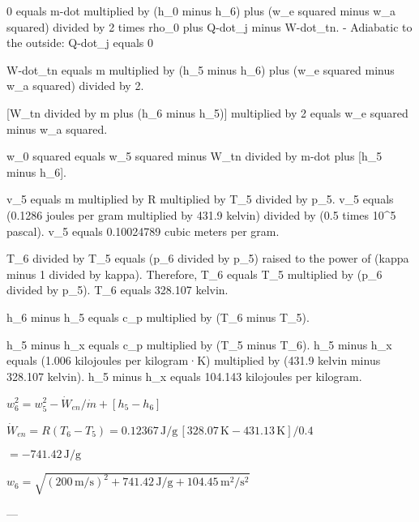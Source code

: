 0 equals m-dot multiplied by (h_0 minus h_6) plus (w_e squared minus w_a squared) divided by 2 times rho_0 plus Q-dot_j minus W-dot_tn.  
- Adiabatic to the outside: Q-dot_j equals 0  

W-dot_tn equals m multiplied by (h_5 minus h_6) plus (w_e squared minus w_a squared) divided by 2.  

[W_tn divided by m plus (h_6 minus h_5)] multiplied by 2 equals w_e squared minus w_a squared.  

w_0 squared equals w_5 squared minus W_tn divided by m-dot plus [h_5 minus h_6].  

v_5 equals m multiplied by R multiplied by T_5 divided by p_5.  
v_5 equals (0.1286 joules per gram multiplied by 431.9 kelvin) divided by (0.5 times 10^5 pascal).  
v_5 equals 0.10024789 cubic meters per gram.  

T_6 divided by T_5 equals (p_6 divided by p_5) raised to the power of (kappa minus 1 divided by kappa).  
Therefore, T_6 equals T_5 multiplied by (p_6 divided by p_5).  
T_6 equals 328.107 kelvin.  

h_6 minus h_5 equals c_p multiplied by (T_6 minus T_5).  

h_5 minus h_x equals c_p multiplied by (T_5 minus T_6).  
h_5 minus h_x equals (1.006 kilojoules per kilogram·K) multiplied by (431.9 kelvin minus 328.107 kelvin).  
h_5 minus h_x equals 104.143 kilojoules per kilogram.

\( w_6^2 = w_5^2 - \dot{W}_{en} / \dot{m} + [h_5 - h_6] \)  

\( \dot{W}_{en} = R(T_6 - T_5) = 0.12367 \, \text{J/g} \, [328.07 \, \text{K} - 431.13 \, \text{K}] / 0.4 \)  

\( = -741.42 \, \text{J/g} \)  

\( w_6 = \sqrt{(200 \, \text{m/s})^2 + 741.42 \, \text{J/g} + 104.45 \, \text{m}^2/\text{s}^2} \)  

---